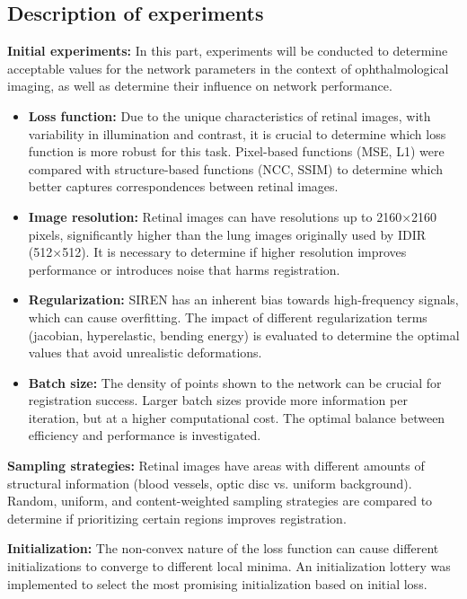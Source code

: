 \subsection{Description of experiments}
\label{subsec:Descrición dos experimentos}

\textbf{Initial experiments:} In this part, experiments will be conducted to determine acceptable values for the network parameters in the context of ophthalmological imaging,
as well as determine their influence on network performance.

\begin{itemize}
    \item \textbf{Loss function:} Due to the unique characteristics of retinal images, with variability in illumination and contrast, it is crucial to determine which loss function is more robust for this task. Pixel-based functions (MSE, L1) were compared with structure-based functions (NCC, SSIM) to determine which better captures correspondences between retinal images.
    \item \textbf{Image resolution:} Retinal images can have resolutions up to 2160×2160 pixels, significantly higher than the lung images originally used by IDIR (512×512). It is necessary to determine if higher resolution improves performance or introduces noise that harms registration.
    \item \textbf{Regularization:} SIREN has an inherent bias towards high-frequency signals, which can cause overfitting. The impact of different regularization terms (jacobian, hyperelastic, bending energy) is evaluated to determine the optimal values that avoid unrealistic deformations.
    \item \textbf{Batch size:} The density of points shown to the network can be crucial for registration success. Larger batch sizes provide more information per iteration, but at a higher computational cost. The optimal balance between efficiency and performance is investigated.
\end{itemize}

\textbf{Sampling strategies:} Retinal images have areas with different amounts of structural information (blood vessels, optic disc vs. uniform background). Random, uniform, and content-weighted sampling strategies are compared to determine if prioritizing certain regions improves registration.

\textbf{Initialization:} The non-convex nature of the loss function can cause different initializations to converge to different local minima. An initialization lottery was implemented to select the most promising initialization based on initial loss.

